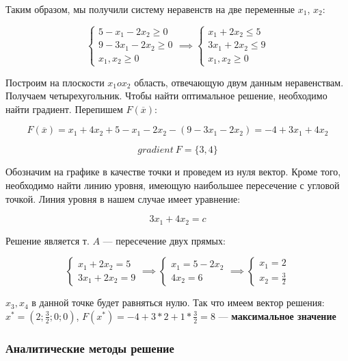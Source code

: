 \documentclass{article}
\begin{document}
Таким образом, мы получили систему неравенств на две переменные $x_1$, $x_2$:

$$
\begin{cases}
    5 - x_1 - 2x_2 \ge 0 \\ 
    9 - 3x_1 - 2x_2 \ge 0 \\
    x_1, x_2 \ge 0
\end{cases} \implies \begin{cases}
    x_1 + 2x_2 \le 5 \\
    3x_1 + 2x_2 \le 9 \\
    x_1, x_2 \ge 0
\end{cases}
$$

Построим на плоскости $x_1 o x_2$ область, отвечающую двум данным неравенствам. Получаем четырехугольник. Чтобы найти оптимальное решение, необходимо найти градиент. Перепишем $F(\overline{x})$:

$$F(\overline{x}) = x_1 + 4x_2 + 5 - x_1 - 2x_2 - (9 - 3x_1 - 2x_2) = -4 + 3x_1 + 4x_2$$

$$gradient \ F = \{ 3, 4 \}$$

Обозначим на графике в качестве точки и проведем из нуля вектор. Кроме того, необходимо найти линию уровня, имеющую наибольшее пересечение с угловой точкой. Линия уровня в нашем случае имеет уравнение:

$$3x_1 + 4x_2 = c$$

Решение является т. $A$ — пересечение двух прямых:

$$
\begin{cases}
    x_1 + 2x_2 = 5 \\
    3x_1 + 2x_2 = 9
\end{cases} \implies \begin{cases}
    x_1 = 5 - 2x_2 \\
    4x_2 = 6
\end{cases} \implies \begin{cases}
    x_1 = 2 \\ 
    x_2 = \frac{3}{2}
\end{cases}
$$

$x_3, x_4$ в данной точке будет равняться нулю. Так что имеем вектор решения: $x^{*} = (2; \frac{3}{2}; 0; 0)$, $F(x^{*}) = -4 + 3 * 2 + 1 * \frac{3}{2} = 8$ — \textbf{максимальное значение}

\subsubsection{Аналитические методы решение}
\end{document}

